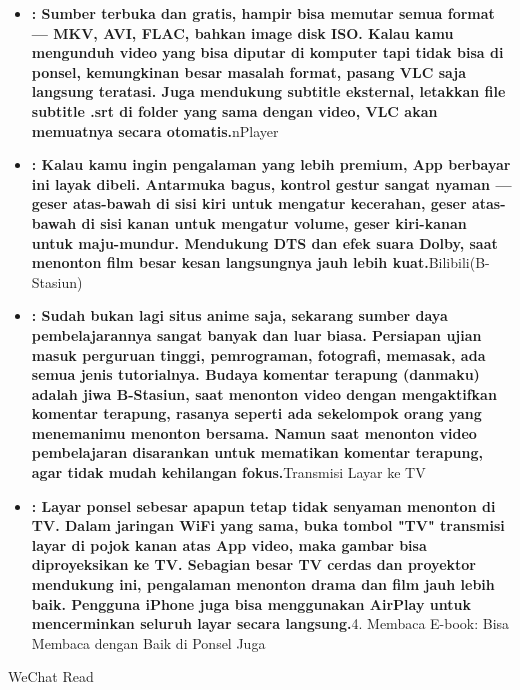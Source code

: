\begin{itemize}
  \item \textbf{: Sumber terbuka dan gratis, hampir bisa memutar semua format — MKV, AVI, FLAC, bahkan image disk ISO. Kalau kamu mengunduh video yang bisa diputar di komputer tapi tidak bisa di ponsel, kemungkinan besar masalah format, pasang VLC saja langsung teratasi. Juga mendukung subtitle eksternal, letakkan file subtitle .srt di folder yang sama dengan video, VLC akan memuatnya secara otomatis.}nPlayer
  \item \textbf{: Kalau kamu ingin pengalaman yang lebih premium, App berbayar ini layak dibeli. Antarmuka bagus, kontrol gestur sangat nyaman — geser atas-bawah di sisi kiri untuk mengatur kecerahan, geser atas-bawah di sisi kanan untuk mengatur volume, geser kiri-kanan untuk maju-mundur. Mendukung DTS dan efek suara Dolby, saat menonton film besar kesan langsungnya jauh lebih kuat.}Bilibili(B-Stasiun)
  \item \textbf{: Sudah bukan lagi situs anime saja, sekarang sumber daya pembelajarannya sangat banyak dan luar biasa. Persiapan ujian masuk perguruan tinggi, pemrograman, fotografi, memasak, ada semua jenis tutorialnya. Budaya komentar terapung (danmaku) adalah jiwa B-Stasiun, saat menonton video dengan mengaktifkan komentar terapung, rasanya seperti ada sekelompok orang yang menemanimu menonton bersama. Namun saat menonton video pembelajaran disarankan untuk mematikan komentar terapung, agar tidak mudah kehilangan fokus.}Transmisi Layar ke TV
  \item \textbf{: Layar ponsel sebesar apapun tetap tidak senyaman menonton di TV. Dalam jaringan WiFi yang sama, buka tombol "TV" transmisi layar di pojok kanan atas App video, maka gambar bisa diproyeksikan ke TV. Sebagian besar TV cerdas dan proyektor mendukung ini, pengalaman menonton drama dan film jauh lebih baik. Pengguna iPhone juga bisa menggunakan AirPlay untuk mencerminkan seluruh layar secara langsung.}4. Membaca E-book: Bisa Membaca dengan Baik di Ponsel Juga
\end{itemize}


WeChat Read

